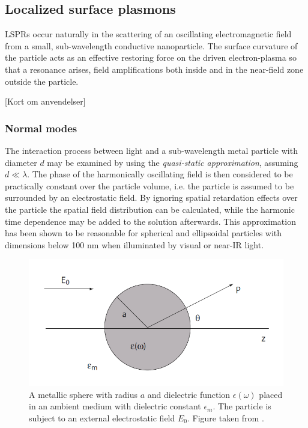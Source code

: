 \subsection{Localized surface plasmons}
LSPRs occur naturally in the scattering of an oscillating electromagnetic field from a small, sub-wavelength conductive nanoparticle. The surface curvature of the particle acts as an effective restoring force on the driven electron-plasma so that a resonance arises, field amplifications both inside and in the near-field zone outside the particle.

[Kort om anvendelser]

\subsubsection{Normal modes}
The interaction process between light and a sub-wavelength metal particle with diameter $d$ may be examined by using the \emph{quasi-static approximation}, assuming $d\ll \lambda$. The  phase  of  the  harmonically  oscillating  field is then considered to be practically constant over the particle volume, i.e. the particle is assumed to be surrounded by an electrostatic field. By ignoring spatial retardation effects over the particle the spatial field distribution can be calculated, while the harmonic time dependence may be added to the solution afterwards. This approximation has been shown to be reasonable for spherical and ellipsoidal particles with dimensions below 100 nm when illuminated by visual or near-IR light\cite{maier}.

\begin{figure}
    \centering
    \includegraphics[scale=0.6]{figures/Ch2/SphereNormalMode.PNG}
    \caption{A metallic sphere with radius $a$ and dielectric function $\epsilon(\omega)$ placed in an ambient medium with dielectric constant $\epsilon_m$. The particle is subject to an external electrostatic field $E_0$. Figure taken from \cite{maier}.} 
    \label{fig:normalmode}
\end{figure}

